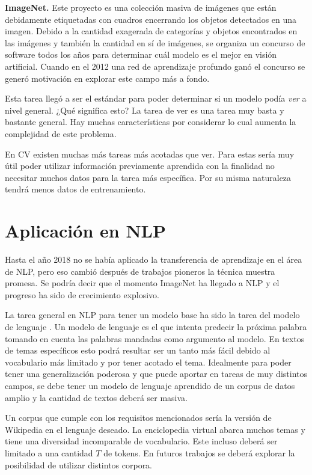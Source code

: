 \textbf{ImageNet.} Este proyecto es una colección masiva de imágenes que están debidamente etiquetadas con cuadros encerrando los objetos detectados en una imagen. Debido a la cantidad exagerada de categorías y objetos encontrados en las imágenes y también la cantidad en sí de imágenes, se organiza un concurso de software todos los años para determinar cuál modelo es el mejor en visión artificial. Cuando en el 2012 una red de aprendizaje profundo ganó el concurso se generó motivación en explorar este campo más a fondo.

Esta tarea llegó a ser el estándar para poder determinar si un modelo podía \emph{ver} a nivel general. ¿Qué significa esto? La tarea de ver es una tarea muy basta y bastante general. Hay muchas características por considerar lo cual aumenta la complejidad de este problema.


En CV existen muchas más tareas más acotadas que ver. Para estas sería muy útil poder utilizar información previamente aprendida con la finalidad no necesitar muchos datos para la tarea más específica. Por su misma naturaleza tendrá menos datos de entrenamiento.

\section{Aplicación en NLP}

Hasta el año 2018 no se había aplicado la transferencia de aprendizaje en el área de NLP, pero eso cambió después de trabajos pioneros \parencite{peters:2018, howard2018, devlin2018bert} la técnica muestra promesa. Se podría decir que el momento ImageNet ha llegado a NLP y el progreso ha sido de crecimiento explosivo.

La tarea general en NLP para tener un modelo base ha sido la tarea del modelo de lenguaje \parencite{howard2018}. Un modelo de lenguaje es el que intenta predecir la próxima palabra tomando en cuenta las palabras mandadas como argumento al modelo. En textos de temas específicos esto podrá resultar ser un tanto más fácil debido al vocabulario más limitado y por tener acotado el tema. Idealmente para poder tener una generalización poderosa y que puede aportar en tareas de muy distintos campos, se debe tener un modelo de lenguaje aprendido de un corpus de datos amplio y la cantidad de textos deberá ser masiva.

Un corpus que cumple con los requisitos mencionados sería la versión de Wikipedia en el lenguaje deseado. La enciclopedia virtual abarca muchos temas y tiene una diversidad incomparable de vocabulario. Este incluso deberá ser limitado a una cantidad $T$ de tokens. En futuros trabajos se deberá explorar la posibilidad de utilizar distintos corpora.

